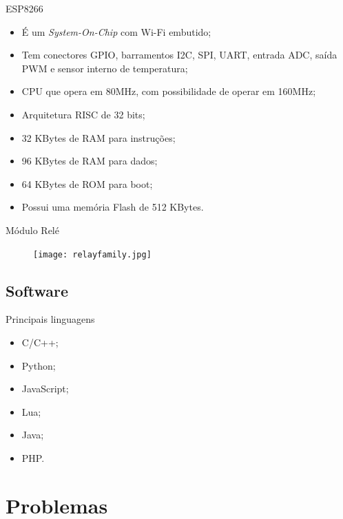 \begin{frame}{ESP8266}
	\begin{itemize}
		\item É um \textit{System-On-Chip} com Wi-Fi embutido;
		\item Tem conectores GPIO, barramentos I2C, SPI, UART, entrada ADC, saída PWM e sensor interno de temperatura;
		\item CPU que opera em 80MHz, com possibilidade de operar em 160MHz;
		\item Arquitetura RISC de 32 bits;
		\item 32 KBytes de RAM para instruções;
		\item 96 KBytes de RAM para dados;
		\item 64 KBytes de ROM para boot;
		\item Possui uma memória Flash de 512 KBytes.
	\end{itemize}	
\end{frame}

\begin{frame}{Módulo Relé}
	\begin{figure}[H]
		\texttt{[image: relayfamily.jpg]}\footnotemark
	\end{figure}
	
\end{frame}

\subsection*{Software}
\begin{frame}{}
	\begin{block}{Principais linguagens}
		\begin{itemize}
			\item C/C++;
			\item Python;
			\item JavaScript;
			\item Lua;
			\item Java;
			\item PHP.
		\end{itemize}
	\end{block}
\end{frame}

\section{Problemas}
\ncframesummary


